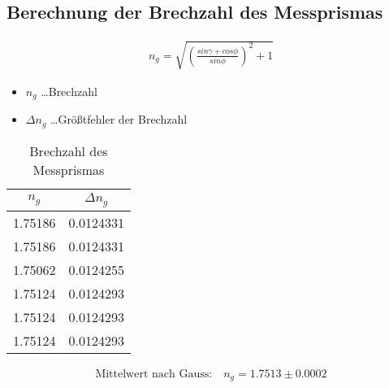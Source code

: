 \documentclass[a4paper]{article}
\begin{document}
\subsection{Berechnung der Brechzahl des Messprismas}
\begin{align}
  n_g=\sqrt{\left(\frac{sin \gamma + cos \phi}{sin \phi}\right)^2+1}
\end{align}
\begin{table}[ht]
				\centering
				\caption{Brechzahl des Messprismas}
				\begin{itemize}
								\item $n_g$ \dots Brechzahl
								\item $\Delta n_g$ \dots Größtfehler der Brechzahl
				\end{itemize}
				\begin{tabular}{|c|c|}\hline
					$n_g$&$\Delta n_g$\\\hline
				 1.75186 & 0.0124331 \\\hline
				 1.75186 & 0.0124331 \\\hline
				 1.75062 & 0.0124255 \\\hline
				 1.75124 & 0.0124293 \\\hline
				 1.75124 & 0.0124293 \\\hline
				 1.75124 & 0.0124293 \\\hline
				\end{tabular}
				\label{tab:brechzahlglas}
\end{table}
\begin{align}
				\text{Mittelwert nach Gauss:}\quad
	n_g = 1.7513\pm0.0002 
\end{align}
\end{document}
